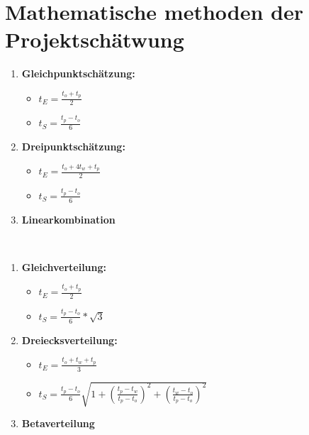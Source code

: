 \documentclass[11pt,a4paper]{article}
\begin{document}
\section{Mathematische methoden der Projektschätwung}

\begin{minipage}[t]{0.5\textwidth}

\begin{enumerate}
	\item \textbf{Gleichpunktschätzung:} 
		\begin{itemize}
			\item $t_E = \frac{t_o + t_p}{2}$ 
			\item $t_S = \frac{t_p - t_o}{6}$ 
		\end{itemize}
	\item \textbf{Dreipunktschätzung:}
		\begin{itemize}
			\item $t_E = \frac{t_o + 4t_w + t_p}{2}$ 
			\item $t_S = \frac{t_p - t_o}{6}$ 
		\end{itemize}
	\item \textbf{Linearkombination}
\end{enumerate}
\end{minipage}
~
\begin{minipage}[t]{0.49\textwidth}
\begin{enumerate}
	\item \textbf{Gleichverteilung:} 
		\begin{itemize}
			\item $t_E = \frac{t_o + t_p}{2}$ 
			\item $t_S = \frac{t_p - t_o}{6} * \sqrt{3}$ 
		\end{itemize}
	\item \textbf{Dreiecksverteilung:}
		\begin{itemize}
			\item $t_E = \frac{t_o + t_w + t_p}{3}$ 
			\item $t_S = \frac{t_p - t_o}{6}\sqrt{1 + \left(\frac{t_p-t_w}{t_p-t_o}\right)^2 + \left(\frac{t_w-t_o}{t_p-t_o}\right)^2}$ 
		\end{itemize}
	\item \textbf{Betaverteilung}
\end{enumerate}
\end{minipage}
\end{document}
